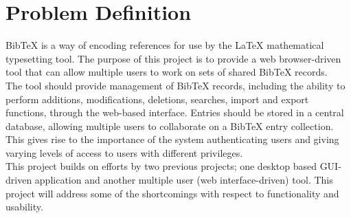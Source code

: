 \section*{Problem Definition}
BibTeX is a way of encoding references for use by the LaTeX mathematical typesetting tool. The purpose of this project is to provide a web browser-driven tool that can allow multiple users to work on sets of shared BibTeX records. \\

The tool should provide management of BibTeX records, including the ability to perform additions, modifications, deletions, searches, import and export functions, through the web-based interface.  Entries should be stored in a central database, allowing multiple users to collaborate on a BibTeX entry collection.  This gives rise to the importance of the system authenticating users and giving varying levels of access to users with different privileges. \\

This project builds on efforts by two previous projects; one desktop based GUI-driven application and another multiple user (web interface-driven) tool.  This project will address some of the shortcomings with respect to functionality and usability. \\

